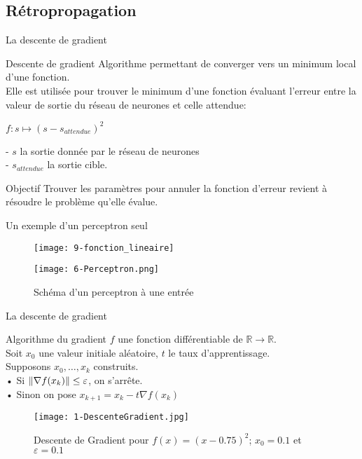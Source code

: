 \subsection{Rétropropagation}

\begin{frame}{La descente de gradient}
    \begin{block}{Descente de gradient}
        Algorithme permettant de converger vers un minimum local d'une fonction. \\
        Elle est utilisée pour trouver le minimum d'une fonction évaluant l'erreur entre la valeur de sortie du réseau de neurones et celle attendue: \\
        \begin{center}
            $f : s \mapsto (s - s_{attendue})^2$\\
        \end{center}
        - $s$ la sortie donnée par le réseau de neurones \\
        - $s_{attendue}$ la sortie cible. \\

    \end{block}
    \begin{exampleblock}{Objectif}
        Trouver les paramètres pour annuler la fonction d'erreur revient à résoudre le problème qu'elle évalue.
    \end{exampleblock}
\end{frame}


\begin{frame}{Un exemple d'un perceptron seul}
    \begin{figure}
        \centering
        \texttt{[image: 9-fonction\_lineaire]}
    \end{figure}
    \begin{figure}
        \centering
        \texttt{[image: 6-Perceptron.png]}
        \caption{Schéma d'un perceptron à une entrée}
    \end{figure}
\end{frame}


\begin{frame}{La descente de gradient}
    \begin{block}{Algorithme du gradient}
        $f$ une fonction différentiable de $\mathbb{R} \to \mathbb{R}$. \\
        Soit $x_0$ une valeur initiale aléatoire, $t$ le taux d'apprentissage. \\
        Supposons $x_0, \ldots, x_k$ construits. \\
        • Si $\| \nabla f(x_k) \| \leq \varepsilon$, on s'arrête. \\
        • Sinon on pose $x_{k+1} = x_k - t \nabla f(x_k)$ \\
    \end{block}
    \begin{figure}
        \centering
        \texttt{[image: 1-DescenteGradient.jpg]}
        \caption{Descente de Gradient pour $f(x) = (x-0.75)^2$; $x_0=0.1$ et $\varepsilon = 0.1$}
    \end{figure}
\end{frame}


